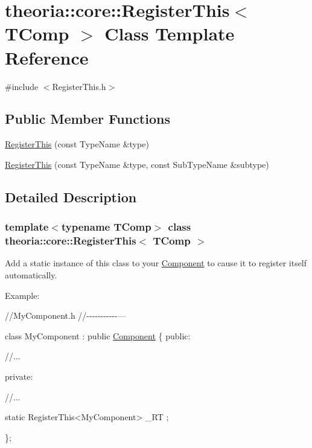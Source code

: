\hypertarget{classtheoria_1_1core_1_1RegisterThis}{}\section{theoria\+:\+:core\+:\+:Register\+This$<$ T\+Comp $>$ Class Template Reference}
\label{classtheoria_1_1core_1_1RegisterThis}


{\ttfamily \#include $<$Register\+This.\+h$>$}

\subsection*{Public Member Functions}
\begin{DoxyCompactItemize}
\item 
\hyperlink{classtheoria_1_1core_1_1RegisterThis_ad736eff7aa2b6819197a839a08382f20}{Register\+This} (const Type\+Name \&type)
\item 
\hyperlink{classtheoria_1_1core_1_1RegisterThis_aec0af7608af32e2b828c7e3953af3695}{Register\+This} (const Type\+Name \&type, const Sub\+Type\+Name \&subtype)
\end{DoxyCompactItemize}


\subsection{Detailed Description}
\subsubsection*{template$<$typename T\+Comp$>$\newline
class theoria\+::core\+::\+Register\+This$<$ T\+Comp $>$}

Add a static instance of this class to your \hyperlink{classtheoria_1_1core_1_1Component}{Component} to cause it to register itself automatically.

Example\+:

//\+My\+Component.h //-\/-\/-\/-\/-\/-\/-\/-\/-\/-\/-\/---

class My\+Component \+: public \hyperlink{classtheoria_1_1core_1_1Component}{Component} \{ public\+: \begin{DoxyVerb}//...
\end{DoxyVerb}


private\+: \begin{DoxyVerb}//...

static RegisterThis<MyComponent> _RT ;
\end{DoxyVerb}
 \};

